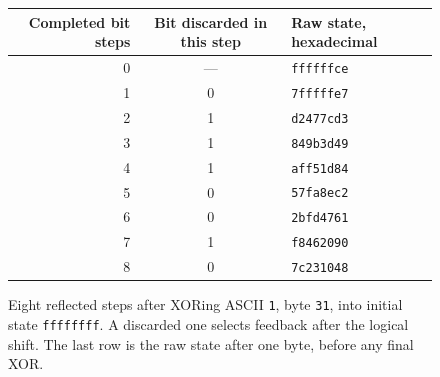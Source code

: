 \begin{figure}[htbp]
  \centering
  \begin{tabular}{r c l}
    \toprule
    Completed bit steps & Bit discarded in this step & Raw state, hexadecimal \\
    \midrule
    0                   & ---                        & \texttt{ffffffce}      \\
    1                   & 0                          & \texttt{7fffffe7}      \\
    2                   & 1                          & \texttt{d2477cd3}      \\
    3                   & 1                          & \texttt{849b3d49}      \\
    4                   & 1                          & \texttt{aff51d84}      \\
    5                   & 0                          & \texttt{57fa8ec2}      \\
    6                   & 0                          & \texttt{2bfd4761}      \\
    7                   & 1                          & \texttt{f8462090}      \\
    8                   & 0                          & \texttt{7c231048}      \\
    \bottomrule
  \end{tabular}
  \caption{Eight reflected steps after XORing ASCII \texttt{1}, byte \texttt{31}, into initial state \texttt{ffffffff}. A discarded one selects feedback after the logical shift. The last row is the raw state after one byte, before any final XOR.}
  \label{fig:revision-crc-first-byte}
\end{figure}
